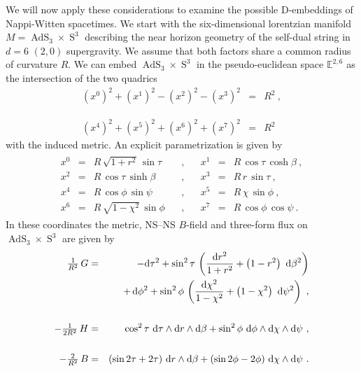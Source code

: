 \documentclass[11pt,a4paper]{article}
\DeclareMathOperator{\AdS}{AdS}
\DeclareMathOperator{\Sphere}{S}
\def\dd{{\rm d}}
\newcommand{\eucl}{{\mathbb E}}
\def\nn{\nonumber}
\def\bea{\begin{eqnarray}}
\def\eea{\end{eqnarray}}
\newcommand{\beq}{\begin{eqnarray}}
\newcommand{\eeq}{\end{eqnarray}}
\begin{document}
We will now apply these considerations to examine the possible
D-embeddings of Nappi-Witten spacetimes. We start with the
six-dimensional lorentzian manifold $M=\AdS_3\times\Sphere^3$
describing the near horizon geometry of the self-dual string in $d=6$
$(2,0)$ supergravity. We assume that both factors share a common radius
of curvature $R$. We can embed $\AdS_3\times\Sphere^3$ in the pseudo-euclidean
space $\eucl^{2,6}$ as the intersection of the two quadrics
\bea
\left(x^0\right)^2+\left(x^1\right)^2-\left(x^2\right)^2-\left(x^3\right)^2
&=&R^2\ , \label{AdS3quadric}\\&&{~~~~}^{~~}_{~~}\nn\\
\left(x^4\right)^2+\left(x^5\right)^2+\left(x^6\right)^2+\left(x^7\right)^2
&=&R^2
\label{S3quadric}\eea
with the induced metric. An explicit parametrization is given by
\beq
\begin{matrix}
x^0&=&R\,\sqrt{1+r^2}\,\sin\tau ~~~~ &,& ~~~~
x^1&=&R\,\cos\tau\,\cosh\beta \ , \\x^2&=&R\,\cos\tau\,\sinh\beta
~~~~ &,& ~~~~ x^3&=&R\,r\,\sin\tau \ , \\x^4&=&R\,\cos\phi\,\sin\psi
~~~~ &,& ~~~~ x^5&=&R\,\chi\,\sin\phi \ , \\x^6&=&R\,\sqrt{1-\chi^2}\,
\sin\phi ~~~~ &,& ~~~~ x^7&=&R\,\cos\phi\,\cos\psi \ .
\end{matrix}
\label{AdS3S3param}\eeq
In these coordinates the metric, NS--NS $B$-field and three-form flux
on $\AdS_3\times\Sphere^3$ are given by
\bea
\mbox{$\frac1{R^2}$}\,
G&=&-\dd\tau^2+\sin^2\tau\,\left(\frac{\dd r^2}{1+r^2}+\left(1-r^2
\right)~\dd\beta^2\right)\nn\\&&+\,\dd\phi^2+\sin^2\phi\,\left(
\frac{\dd\chi^2}{1-\chi^2}+\left(1-\chi^2\right)~\dd\psi^2\right) \ ,
\label{AdS3S3metric}\\&&{~~~~}^{~~}_{~~}\nn\\
-\mbox{$\frac1{2R^2}$}\,H&=&\cos^2\tau~\dd\tau\wedge
\dd r\wedge\dd\beta+\sin^2\phi~\dd\phi\wedge\dd\chi\wedge\dd\psi \ ,
\label{AdS3S3flux}\\&&{~~~~}_{~~}^{~~}\nn\\-\mbox{$\frac2{R^2}$}\,
B&=&(\sin2\tau+2\tau)~\dd r\wedge\dd\beta+
(\sin2\phi-2\phi)~\dd\chi\wedge\dd\psi \ .
\label{AdS3S3Bfield}\eea
\end{document}
